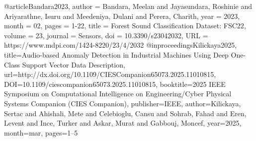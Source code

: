 @article{Bandara2023,
    author = {Bandara, Meelan and Jayasundara, Roshinie and Ariyarathne, Isuru and Meedeniya, Dulani and Perera, Charith},
    year = {2023},
    month = {02},
    pages = {1-22},
    title = {Forest Sound Classification Dataset: FSC22},
    volume = {23},
    journal = {Sensors},
    doi = {10.3390/s23042032},
    URL = {https://www.mdpi.com/1424-8220/23/4/2032}
}%
@inproceedings{Kilickaya2025,
    title={Audio-based Anomaly Detection in Industrial Machines Using Deep One-Class Support Vector Data Description},
    url={http://dx.doi.org/10.1109/CIESCompanion65073.2025.11010815},
    DOI={10.1109/ciescompanion65073.2025.11010815},
    booktitle={2025 IEEE Symposium on Computational Intelligence on Engineering/Cyber Physical Systems Companion (CIES Companion)},
    publisher={IEEE},
    author={Kilickaya, Sertac and Ahishali, Mete and Celebioglu, Cansu and Sohrab, Fahad and Eren, Levent and Ince, Turker and Askar, Murat and Gabbouj, Moncef},
    year={2025},
    month=mar, pages={1–5} 
}%

